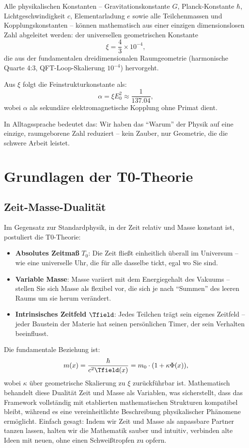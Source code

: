 	\begin{keyresult}
		Alle physikalischen Konstanten – Gravitationskonstante $G$, Planck-Konstante $\hbar$, Lichtgeschwindigkeit $c$, Elementarladung $e$ sowie alle Teilchenmassen und Kopplungskonstanten – können mathematisch aus einer einzigen dimensionslosen Zahl abgeleitet werden: der universellen geometrischen Konstante
		\[
		\xi = \frac{4}{3} \times 10^{-4},
		\]
		die aus der fundamentalen dreidimensionalen Raumgeometrie (harmonische Quarte 4:3, QFT-Loop-Skalierung $10^{-4}$) hervorgeht.

		Aus $\xi$ folgt die Feinstrukturkonstante als:
		\[
		\alpha = \xi E_0^2 \approx \frac{1}{137.04},
		\]
		wobei $\alpha$ als sekundäre elektromagnetische Kopplung ohne Primat dient.
	\end{keyresult}
	
	In Alltagssprache bedeutet das: Wir haben das ``Warum'' der Physik auf eine einzige, raumgeborene Zahl reduziert – kein Zauber, nur Geometrie, die die schwere Arbeit leistet.
	
	\section{Grundlagen der T0-Theorie}
	
	\subsection{Zeit-Masse-Dualität}
	Im Gegensatz zur Standardphysik, in der Zeit relativ und Masse konstant ist, postuliert die T0-Theorie:
	\begin{itemize}
		\item \textbf{Absolutes Zeitmaß} $T_0$: Die Zeit fließt einheitlich überall im Universum – wie eine universelle Uhr, die für alle dasselbe tickt, egal wo Sie sind.
		\item \textbf{Variable Masse}: Masse variiert mit dem Energiegehalt des Vakuums – stellen Sie sich Masse als flexibel vor, die sich je nach ``Summen'' des leeren Raums um sie herum verändert.
		\item \textbf{Intrinsisches Zeitfeld} $\Tfield$: Jedes Teilchen trägt sein eigenes Zeitfeld – jeder Baustein der Materie hat seinen persönlichen Timer, der sein Verhalten beeinflusst.
	\end{itemize}
	
	Die fundamentale Beziehung ist:
	\[
	m(x) = \frac{\hbar}{c^2 \Tfield(x)} = m_0 \cdot (1 + \kappa \Phi(x)),
	\]
	wobei $\kappa$ über geometrische Skalierung zu $\xi$ zurückführbar ist. Mathematisch behandelt diese Dualität Zeit und Masse als Variablen, was sicherstellt, dass das Framework vollständig mit etablierten mathematischen Strukturen kompatibel bleibt, während es eine vereinheitlichte Beschreibung physikalischer Phänomene ermöglicht. Einfach gesagt: Indem wir Zeit und Masse als anpassbare Partner tanzen lassen, halten wir die Mathematik sauber und intuitiv, verbinden alte Ideen mit neuen, ohne einen Schweißtropfen zu opfern.
	
